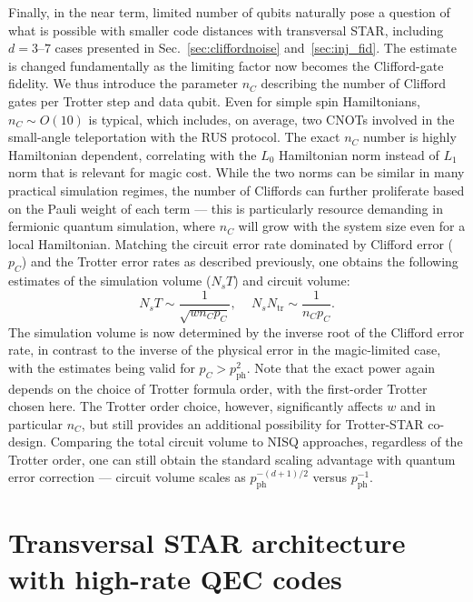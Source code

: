 \documentclass[aps, prx, reprint, superscriptaddress, longbibliography, floatfix]{revtex4-2}
\begin{document}
Finally, in the near term, limited number of qubits naturally pose a question of what is possible with smaller code distances with transversal STAR, including $d=3\text{--}7$ cases presented in Sec.~\ref{sec:cliffordnoise} and~\ref{sec:inj_fid}. The estimate is changed fundamentally as the limiting factor now becomes the Clifford-gate fidelity. We thus introduce the parameter $n_C$ describing the number of Clifford gates per Trotter step and data qubit. Even for simple spin Hamiltonians, $n_C \sim O(10)$ is typical, which includes, on average, two CNOTs involved in the small-angle teleportation with the RUS protocol. The exact $n_C$ number is highly Hamiltonian dependent, correlating with the $L_0$ Hamiltonian norm instead of $L_1$ norm that is relevant for magic cost. While the two norms can be similar in many practical simulation regimes, the number of Cliffords can further proliferate based on the Pauli weight of each term --- this is particularly resource demanding in fermionic quantum simulation, where $n_C$ will grow with the system size even for a local Hamiltonian. Matching the circuit error rate dominated by Clifford error ($p_C$) and the Trotter error rates as described previously, one obtains the following estimates of the simulation volume ($N_sT$) and circuit volume:
\begin{equation}\label{eq:STAR_Clifford limit}
    N_sT\sim \frac{1}{\sqrt{w n_Cp_C}}, \, \quad N_sN_{\mathrm{tr}}\sim\frac{1}{n_Cp_C}.
\end{equation}
The simulation volume is now determined by the inverse root of the Clifford error rate, in contrast to the inverse of the physical error in the magic-limited case, with the estimates being valid for $p_C > p_{\mathrm{ph}}^2$. Note that the exact power again depends on the choice of Trotter formula order, with the first-order Trotter chosen here. The Trotter order choice, however, significantly affects $w$ and in particular $n_C$, but still provides an additional possibility for Trotter-STAR co-design. Comparing the total circuit volume to NISQ approaches, regardless of the Trotter order, one can still obtain the standard scaling advantage with quantum error correction --- circuit volume scales as $ p_{\mathrm{ph}}^{-(d+1)/2}$ versus $p_{\mathrm{ph}}^{-1}$. 



\section{Transversal STAR architecture with high-rate QEC codes}
\label{sec:disc_qLDPC}
\end{document}

